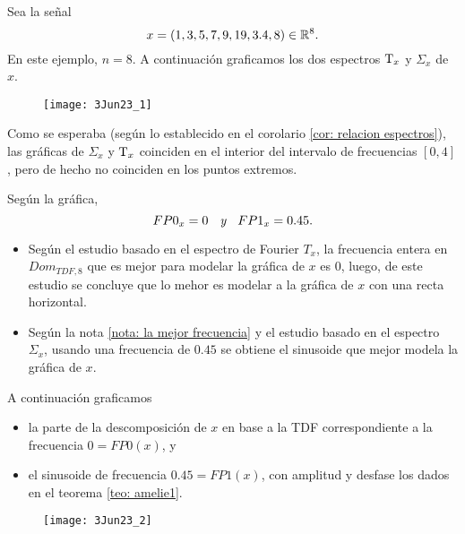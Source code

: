 \begin{ejemplo}
Sea la señal 
\[
x = (1, 3, 5, 7, 9, 19, 3.4, 8) \in \mathbb{R}^{8}.
\]
En este ejemplo, $n =8$.
A continuación graficamos los dos espectros
$\mathrm{T}_{x}$ y $\Sigma_{x}$ de $x$.
\begin{figure}[H]
	\centering
	\texttt{[image: 3Jun23\_1]} 
\end{figure}	

Como se esperaba (según lo establecido en 
el corolario \ref{cor: relacion espectros}), 
las gráficas de $\Sigma_{x}$ y $\mathrm{T}_{x}$ coinciden
en el interior del intervalo de frecuencias $[0,4]$, 
pero de hecho no coinciden en los puntos extremos.

Según la gráfica, 
\[
FP0_{x} = 0 \hspace{0.2cm} \textit{ y }
\hspace{0.2cm} FP1_{x} = 0.45.
\]

\begin{itemize}
	\item Según el estudio basado en el espectro de Fourier 
	$T_{x}$, la frecuencia entera en $Dom_{TDF, 8}$ que es
	mejor para modelar la gráfica de $x$ es $0$, luego, 
	de este estudio se concluye que lo mehor es modelar
	a la gráfica de $x$ con una recta horizontal.
	
	\item Según la nota 
	\ref{nota: la mejor frecuencia} y el estudio basado
	en el espectro $\Sigma_{x}$,
	usando una frecuencia de $0.45$ se obtiene el sinusoide que mejor
	modela la gráfica de $x$.
\end{itemize}
A continuación graficamos
\begin{itemize}
	\item la parte de la descomposición de $x$ en base
	a la TDF correspondiente a la frecuencia $0 = FP0(x)$, y
	\item el sinusoide de frecuencia $0.45 = FP1(x)$, con 
	amplitud y desfase los dados en el teorema 
	\ref{teo: amelie1}.
\end{itemize}

\begin{figure}[H]
	\centering
	\texttt{[image: 3Jun23\_2]} 
\end{figure}	
\final
\end{ejemplo}


